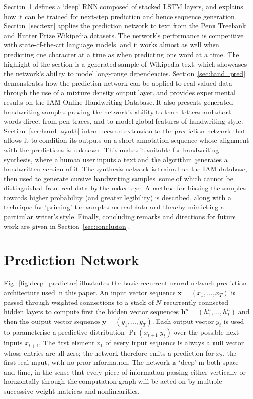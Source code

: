 \documentclass{article}
\newcommand{\seclabel}[1]{\label{sec:#1}}
\newcommand{\fref}[1]{Fig.~\ref{fig:#1}}
\newcommand{\sref}[1]{Section~\ref{sec:#1}}
\newcommand{\seq}[1]{\mathbf{#1}}
\newcommand{\invble}{x}
\newcommand{\outvble}{y}
\newcommand{\inseq}{\seq{\invble}}
\newcommand{\outseq}{\seq{\outvble}}
\begin{document}
\sref{pred_net} defines a `deep' RNN composed of stacked LSTM layers, and explains how it can be trained for next-step prediction and hence sequence generation.
\sref{text} applies the prediction network to text from the Penn Treebank and Hutter Prize Wikipedia datasets.
The network's performance is competitive with state-of-the-art language models, and it works almost as well when predicting one character at a time as when predicting one word at a time.
The highlight of the section is a generated sample of Wikipedia text, which showcases the network's ability to model long-range dependencies.
\sref{hand_pred} demonstrates how the prediction network can be applied to real-valued data through the use of a mixture density output layer, and provides experimental results on the IAM Online Handwriting Database.
It also presents generated handwriting samples proving the network's ability to learn letters and short words direct from pen traces, and to model global features of handwriting style.
\sref{hand_synth} introduces an extension to the prediction network that allows it to condition its outputs on a short annotation sequence whose alignment with the predictions is unknown.
This makes it suitable for handwriting synthesis, where a human user inputs a text and the algorithm generates a handwritten version of it.
The synthesis network is trained on the IAM database, then used to generate cursive handwriting samples, some of which cannot be distinguished from real data by the naked eye.
A method for biasing the samples towards higher probability (and greater legibility) is described, along with a technique for `priming' the samples on real data and thereby mimicking a particular writer's style.
Finally, concluding remarks and directions for future work are given in \sref{conclusion}.


\section{Prediction Network}
\seclabel{pred_net}
\fref{deep_predictor} illustrates the basic recurrent neural network prediction architecture used in this paper.
An input vector sequence $\inseq = (x_1,\ldots,x_T)$ is passed through weighted connections to a stack of $N$ recurrently connected hidden layers to compute first the hidden vector sequences $\seq{h}^n = (h^n_1,\ldots,h^n_T)$ and then the output vector sequence $\outseq = (y_1,\ldots,y_T)$.
Each output vector $y_t$ is used to parameterise a predictive distribution $\Pr(x_{t+1}|y_t)$ over the possible next inputs $x_{t+1}$.
The first element $x_1$ of every input sequence is always a null vector whose entries are all zero; the network therefore emits a prediction for $x_2$, the first real input, with no prior information.
The network is `deep' in both space and time, in the sense that every piece of information passing either vertically or horizontally through the computation graph will be acted on by multiple successive weight matrices and nonlinearities.
\end{document}
